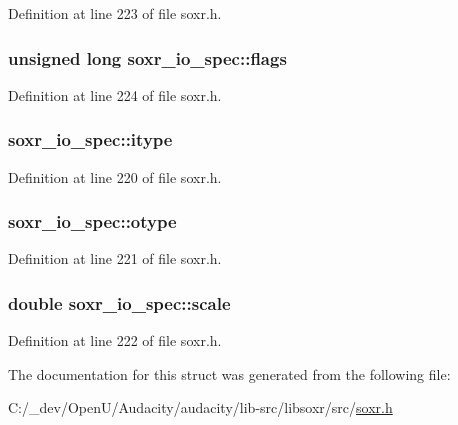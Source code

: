 Definition at line 223 of file soxr.\+h.

\subsubsection[{\texorpdfstring{flags}{flags}}]{\setlength{\rightskip}{0pt plus 5cm}unsigned long soxr\+\_\+io\+\_\+spec\+::flags}\hypertarget{structsoxr__io__spec_a69aa73bb10ef8eb5d5da797d96c8268a}{}\label{structsoxr__io__spec_a69aa73bb10ef8eb5d5da797d96c8268a}


Definition at line 224 of file soxr.\+h.

\subsubsection[{\texorpdfstring{itype}{itype}}]{ soxr\+\_\+io\+\_\+spec\+::itype}\hypertarget{structsoxr__io__spec_a9d98ffac1d4103593adeff47fd84eded}{}\label{structsoxr__io__spec_a9d98ffac1d4103593adeff47fd84eded}


Definition at line 220 of file soxr.\+h.

\subsubsection[{\texorpdfstring{otype}{otype}}]{ soxr\+\_\+io\+\_\+spec\+::otype}\hypertarget{structsoxr__io__spec_ac8e5ca279ab7ab0a86ee63a1dcd2a2f7}{}\label{structsoxr__io__spec_ac8e5ca279ab7ab0a86ee63a1dcd2a2f7}


Definition at line 221 of file soxr.\+h.

\subsubsection[{\texorpdfstring{scale}{scale}}]{\setlength{\rightskip}{0pt plus 5cm}double soxr\+\_\+io\+\_\+spec\+::scale}\hypertarget{structsoxr__io__spec_a7e7adcf5254eace48979ba959babb5db}{}\label{structsoxr__io__spec_a7e7adcf5254eace48979ba959babb5db}


Definition at line 222 of file soxr.\+h.



The documentation for this struct was generated from the following file\+:\begin{DoxyCompactItemize}
\item 
C\+:/\+\_\+dev/\+Open\+U/\+Audacity/audacity/lib-\/src/libsoxr/src/\hyperlink{soxr_8h}{soxr.\+h}\end{DoxyCompactItemize}
